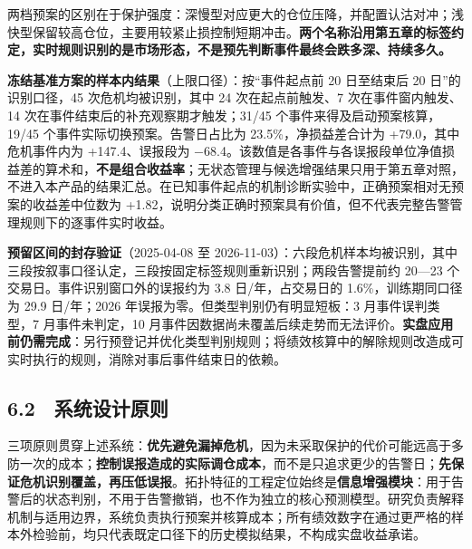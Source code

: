 \documentclass[12pt,a4paper]{ctexart}
\begin{document}
两档预案的区别在于保护强度：深慢型对应更大的仓位压降，并配置认沽对冲；浅快型保留较高仓位，主要用较紧止损控制短期冲击。\textbf{两个名称沿用第五章的标签约定，实时规则识别的是市场形态，不是预先判断事件最终会跌多深、持续多久。}\par
\textbf{冻结基准方案的样本内结果}（上限口径）：按“事件起点前 20 日至结束后 20 日”的识别口径，45 次危机均被识别，其中 24 次在起点前触发、7 次在事件窗内触发、14 次在事件结束后的补充观察期才触发；31/45 个事件来得及启动预案核算，19/45 个事件实际切换预案。告警日占比为 23.5\%，净损益差合计为 +79.0，其中危机事件内为 +147.4、误报段为 \(-\)68.4。该数值是各事件与各误报段单位净值损益差的算术和，\textbf{不是组合收益率}；无状态管理与候选增强结果只用于第五章对照，不进入本产品的结果汇总。在已知事件起点的机制诊断实验中，正确预案相对无预案的收益差中位数为 +1.82，说明分类正确时预案具有价值，但不代表完整告警管理规则下的逐事件实时收益。\par
\textbf{预留区间的封存验证}（2025-04-08 至 2026-11-03）：六段危机样本均被识别，其中三段按叙事口径认定，三段按固定标签规则重新识别；两段告警提前约 20—23 个交易日。事件识别窗口外的误报约为 3.8 日/年，占交易日的 1.6\%，训练期同口径为 29.9 日/年；2026 年误报为零。但类型判别仍有明显短板：3 月事件误判类型，7 月事件未判定，10 月事件因数据尚未覆盖后续走势而无法评价。\textbf{实盘应用前仍需完成}：另行预登记并优化类型判别规则；将绩效核算中的解除规则改造成可实时执行的规则，消除对事后事件结束日的依赖。\par
\subsection{6.2　系统设计原则}
三项原则贯穿上述系统：\textbf{优先避免漏掉危机}，因为未采取保护的代价可能远高于多防一次的成本；\textbf{控制误报造成的实际调仓成本}，而不是只追求更少的告警日；\textbf{先保证危机识别覆盖，再压低误报}。拓扑特征的工程定位始终是\textbf{信息增强模块}：用于告警后的状态判别，不用于告警撤销，也不作为独立的核心预测模型。研究负责解释机制与适用边界，系统负责执行预案并核算成本；所有绩效数字在通过更严格的样本外检验前，均只代表既定口径下的历史模拟结果，不构成实盘收益承诺。\par
\end{document}
